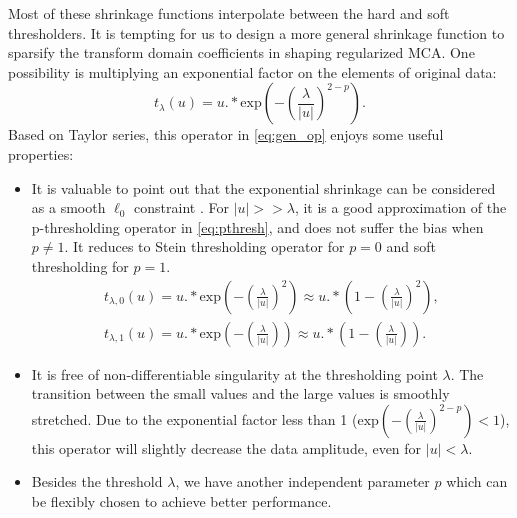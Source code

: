 Most of these shrinkage functions interpolate between the hard and soft thresholders. It is tempting for us to design a more general shrinkage function to sparsify the transform domain coefficients in shaping regularized MCA. One possibility is  multiplying an exponential factor on the elements of original data:
\begin{equation}\label{eq:gen_op}
t_{\lambda}(u)=u.*\mathrm{exp}(-(\frac{\lambda}{|u|})^{2-p}).
\end{equation}
Based on Taylor series, this operator in \eqref{eq:gen_op} enjoys some useful properties:
\begin{itemize}
 \item It is valuable to point out that the exponential shrinkage can be considered as a smooth $\ell_0$ constraint \citep{mohimani2009fast,gholami2011}.
For $|u|>>\lambda$, it is a good approximation of the p-thresholding operator in \eqref{eq:pthresh}, and does not suffer the bias when $p\neq 1$. It reduces to Stein thresholding operator for $p=0$ and soft thresholding for $p=1$. 
  \begin{equation}\label{eq:exp_sergey} 
  \begin{split}   
  t_{\lambda,0}(u)=u.*\mathrm{exp}(-(\frac{\lambda}{|u|})^{2})\approx u.*(1-(\frac{\lambda}{|u|})^{2}),\\
  t_{\lambda,1}(u)=u.*\mathrm{exp}(-(\frac{\lambda}{|u|}))\approx u.*(1-(\frac{\lambda}{|u|})).
  \end{split}
\end{equation}
 \item It is free of non-differentiable singularity at the thresholding point $\lambda$. The transition between the small values and the large values is smoothly stretched. Due to the exponential factor less than 1 ($\mathrm{exp}(-(\frac{\lambda}{|u|})^{2-p})<1$), this operator will slightly decrease the data amplitude, even for $|u|<\lambda$.
 \item Besides the threshold $\lambda$, we have another independent parameter $p$ which can be flexibly chosen to achieve better performance.
\end{itemize}

